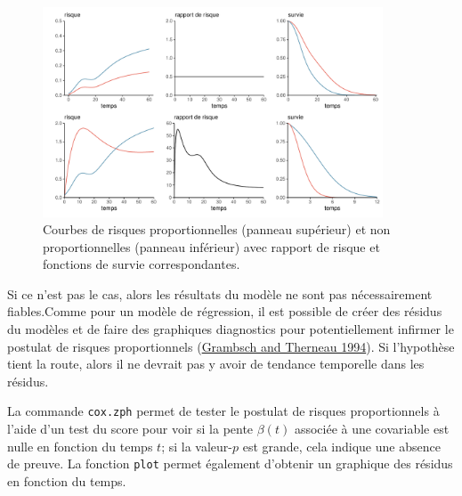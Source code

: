 \documentclass[
  11pt,
  letterpaper,
]{scrbook}
\theoremstyle{definition}
\theoremstyle{remark}
\begin{document}
\begin{figure}[ht!]

{\centering \includegraphics[width=0.9\textwidth,height=\textheight]{survie_files/figure-pdf/fig-risquepropfig-1.pdf}

}

\caption{\label{fig-risquepropfig}Courbes de risques proportionnelles
(panneau supérieur) et non proportionnelles (panneau inférieur) avec
rapport de risque et fonctions de survie correspondantes.}

\end{figure}

Si ce n'est pas le cas, alors les résultats du modèle ne sont pas
nécessairement fiables.Comme pour un modèle de régression, il est
possible de créer des résidus du modèles et de faire des graphiques
diagnostics pour potentiellement infirmer le postulat de risques
proportionnels (\protect\hyperlink{ref-Grambsch.Therneau:1994}{Grambsch
and Therneau 1994}). Si l'hypothèse tient la route, alors il ne devrait
pas y avoir de tendance temporelle dans les résidus.

La commande \texttt{cox.zph} permet de tester le postulat de risques
proportionnels à l'aide d'un test du score pour voir si la pente
\(\beta(t)\) associée à une covariable est nulle en fonction du temps
\(t\); si la valeur-\(p\) est grande, cela indique une absence de
preuve. La fonction \texttt{plot} permet également d'obtenir un
graphique des résidus en fonction du temps.
\end{document}
